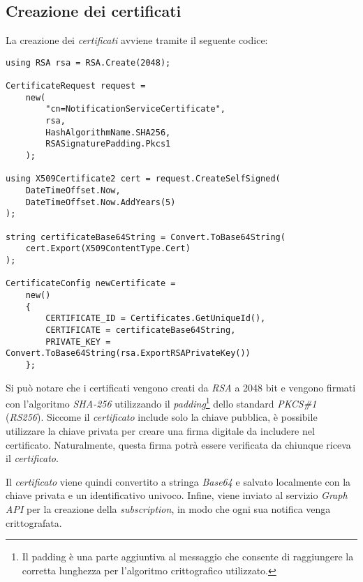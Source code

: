 \subsection{Creazione dei certificati}

\noindent La creazione dei \emph{certificati} avviene tramite il seguente codice:



\begin{lstlisting}
using RSA rsa = RSA.Create(2048);

CertificateRequest request =
	new(
		"cn=NotificationServiceCertificate",
		rsa,
		HashAlgorithmName.SHA256,
		RSASignaturePadding.Pkcs1
	);

using X509Certificate2 cert = request.CreateSelfSigned(
	DateTimeOffset.Now,
	DateTimeOffset.Now.AddYears(5)
);

string certificateBase64String = Convert.ToBase64String(
	cert.Export(X509ContentType.Cert)
);

CertificateConfig newCertificate =
	new()
	{
		CERTIFICATE_ID = Certificates.GetUniqueId(),
		CERTIFICATE = certificateBase64String,
		PRIVATE_KEY = Convert.ToBase64String(rsa.ExportRSAPrivateKey())
	};
\end{lstlisting}

\bigskip

Si può notare che i certificati vengono creati da \emph{RSA} a 2048 bit e vengono firmati con l'algoritmo \emph{SHA-256} utilizzando il \emph{padding}\footnote{Il padding è una parte aggiuntiva al messaggio che consente di raggiungere la corretta lunghezza per l'algoritmo crittografico utilizzato.} dello standard \emph{PKCS\#1} (\emph{RS256}).
Siccome il \emph{certificato} include solo la chiave pubblica, è possibile utilizzare la chiave privata per creare una firma digitale da includere nel certificato. Naturalmente, questa firma potrà essere verificata da chiunque riceva il \emph{certificato}.

Il \emph{certificato} viene quindi convertito a stringa \emph{Base64} e salvato localmente con la chiave privata e un identificativo univoco.
Infine, viene inviato al servizio \emph{Graph API} per la creazione della \emph{subscription}, in modo che ogni sua notifica venga crittografata.

